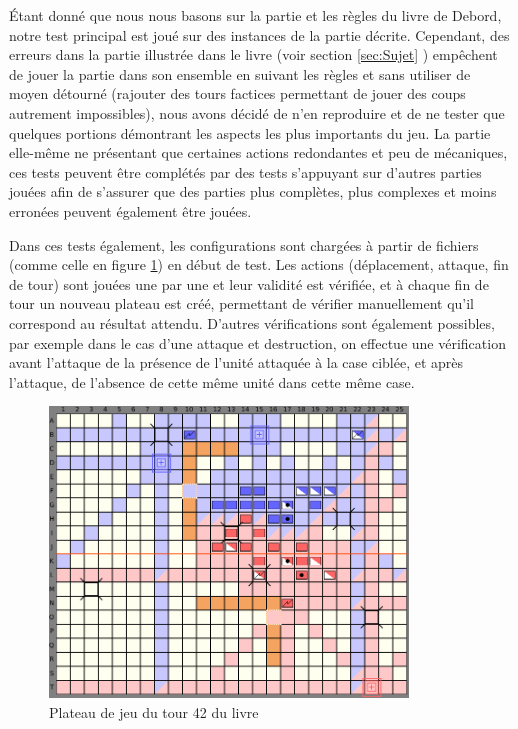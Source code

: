 \documentclass[a4paper]{report}
\begin{document}
Étant donné que nous nous basons sur la partie et les règles du livre de Debord\cite{jdg}, notre test principal est joué sur des instances de la partie décrite. Cependant, des erreurs dans la partie illustrée dans le livre (voir section \ref{sec:Sujet} ) empêchent de jouer la partie dans son ensemble en suivant les règles et sans utiliser de moyen détourné (rajouter des tours factices permettant de jouer des coups autrement impossibles), nous avons décidé de n'en reproduire et de ne tester que quelques portions démontrant les aspects les plus importants du jeu. La partie elle-même ne présentant que certaines actions redondantes et peu de mécaniques, ces tests peuvent être complétés par des tests s'appuyant sur d'autres parties jouées afin de s'assurer que des parties plus complètes, plus complexes et moins erronées peuvent également être jouées.

Dans ces tests également, les configurations sont chargées à partir de fichiers (comme celle en figure \ref{fig:boardTurn42}) en début de test. Les actions (déplacement, attaque, fin de tour) sont jouées une par une et leur validité est vérifiée, et à chaque fin de tour un nouveau plateau est créé, permettant de vérifier manuellement qu'il correspond au résultat attendu. D'autres vérifications sont également possibles, par exemple dans le cas d'une attaque et destruction, on effectue une vérification avant l'attaque de la présence de l'unité attaquée à la case ciblée, et après l'attaque, de l'absence de cette même unité dans cette même case.

\begin{figure}[h]
\centering
\includegraphics[width=0.85\textwidth]{tests/plateauTour42}
\caption{Plateau de jeu du tour 42 du livre}\label{fig:boardTurn42}
\end{figure}
\end{document}
